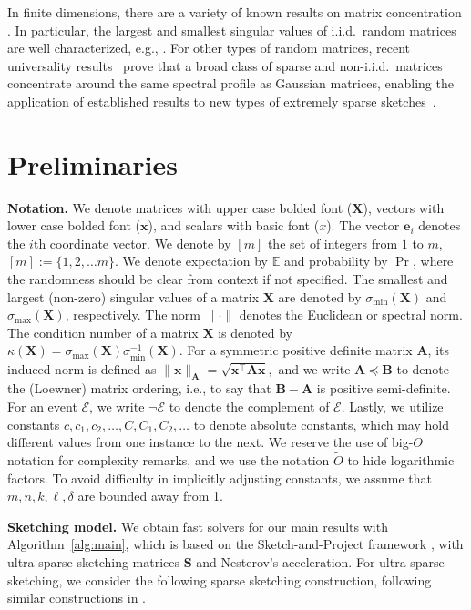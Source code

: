 \documentclass[11pt]{article}
\let\origtop\top
\renewcommand\top{{\scriptscriptstyle{\origtop}}}
\def\x{{\mathbf x}}
\def\e{{\mathbf e}}
\def\A{{\mathbf A}}
\def\B{{\mathbf B}}
\def\S{{\mathbf S}}
\def\X{{\mathbf X}}
\def\Ec{{\mathcal E}}
\def\E{{\mathds E}}
\begin{document}
In finite dimensions, there are a variety of known results on matrix concentration \cite{vershynin_2018}. In particular, the largest and smallest singular values of i.i.d.\  random matrices are well characterized, e.g., \cite{rudelson2009smallest,oymak2018universality}. For other types of random matrices, recent universality results~\cite{brailovskaya2024universality} prove that a broad class of sparse and non-i.i.d.\ matrices concentrate around the same spectral profile as Gaussian matrices, enabling the application of established results to new types of extremely sparse sketches~\cite{chenakkod2023optimal}.


\section{Preliminaries}
\textbf{Notation.} We denote matrices with upper case bolded font ($\X$), vectors with lower case bolded font ($\x$), and scalars with basic font ($x$). 
The vector $\e_i$ denotes the $i$th coordinate vector. We denote by $[m]$ the set of integers from $1$ to $m$, $[m] := \{1, 2, \ldots m\}$. We denote expectation by $\E$ and probability by $\Pr$, where the randomness should be clear from context if not specified. The smallest and largest (non-zero) singular values of a matrix $\X$ are denoted by $\sigma_{\min}(\X)$ and $\sigma_{\max}(\X)$, respectively.  The norm $\|\cdot\|$ denotes the Euclidean or spectral norm. The condition number of a matrix $\X$ is denoted by $\kappa(\X) = \sigma_{\max}(\X)\sigma^{-1}_{\min}(\X)$. For a symmetric positive definite matrix $\A$, its induced norm is defined as $\|\x\|_\A = \sqrt{\x^\top \A\x},$ and we write $\A \preceq \B$ to denote the (Loewner) matrix ordering, i.e., to say that $\B - \A$ is positive semi-definite. For an event $\Ec$, we write $\neg\Ec$ to denote the complement of $\Ec$. Lastly, we utilize constants $c, c_1, c_2, \ldots, C, C_1, C_2, \ldots$ to denote absolute constants, which may hold different values from one instance to the next. We reserve the use of big-$O$ notation for complexity remarks, and we use the notation $\tilde O$ to hide logarithmic factors. To avoid difficulty in implicitly adjusting constants, we assume that $m, n, k, \ell, \delta$ are bounded away from 1. 

\smallskip

\noindent
\textbf{Sketching model.} We obtain fast solvers for our main results with Algorithm~\ref{alg:main}, which is based on the Sketch-and-Project framework \cite{gower2015randomized}, with ultra-sparse sketching matrices $\S$ and Nesterov's acceleration. For ultra-sparse sketching, we consider the following sparse sketching construction, following similar constructions in \cite{derezinski2021sparse,chenakkod2023optimal}.
\end{document}
